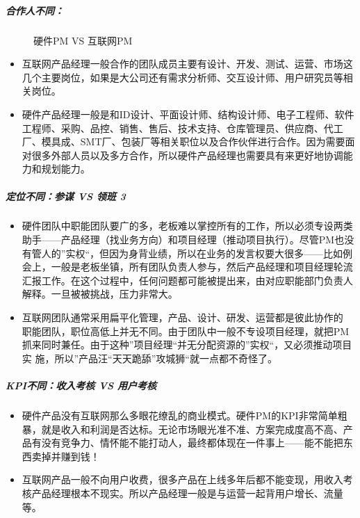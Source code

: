 \documentclass[letterpaper,11pt,english]{sphinxmanual}
\begin{document}
\subparagraph{合作人不同：}
\label{\detokenize{chapter_project/AI_hardware:id4}}
\begin{figure}[H]
\centering
\capstart

\noindent{}
\caption{硬件PM VS 互联网PM}\label{\detokenize{chapter_project/AI_hardware:id33}}\end{figure}
\begin{itemize}
\item {} 
互联网产品经理一般合作的团队成员主要有设计、开发、测试、运营、市场这几个主要岗位，如果是大公司还有需求分析师、交互设计师、用户研究员等相关岗位。

\item {} 
硬件产品经理一般是和ID设计、平面设计师、结构设计师、电子工程师、软件工程师、采购、品控、销售、售后、技术支持、仓库管理员、供应商、代工厂、模具成、SMT厂、包装厂等相关职位以及合作伙伴进行合作。因为需要面对很多外部人员以及多方合作，所以硬件产品经理也需要具有来更好地协调能力和规划能力。

\end{itemize}


\subparagraph{定位不同：参谋 VS 领班 3\sphinxfootnotemark[715]}
\label{\detokenize{chapter_project/AI_hardware:vs-3}}%
\begin{footnotetext}[715]\sphinxAtStartFootnote
{}
%
\end{footnotetext}\ignorespaces \begin{itemize}
\item {} 
硬件团队中职能团队要广的多，老板难以掌控所有的工作，所以必须专设两类助手——产品经理（找业务方向）和项目经理（推动项目执行）。尽管PM也没有管人的”实权“，但因为身背业绩，所以在业务的发言权要大很多——比如例会上，一般是老板坐镇，所有团队负责人参与，然后产品经理和项目经理轮流汇报工作。在这个过程中，任何问题都可能被提出来，由对应职能部门负责人解释。一旦被被挑战，压力非常大。

\item {} 
互联网团队通常采用扁平化管理，产品、设计、研发、运营都是彼此协作的
职能团队，职位高低上并无不同。由于团队中一般不专设项目经理，就把PM抓来同时兼任。由于这种”项目经理“并无分配资源的”实权“，又必须推动项目实
施，所以”产品汪“天天跪舔”攻城狮“就一点都不奇怪了。

\end{itemize}


\subparagraph{KPI不同：收入考核 VS 用户考核}
\label{\detokenize{chapter_project/AI_hardware:kpi-vs}}\begin{itemize}
\item {} 
硬件产品没有互联网那么多眼花缭乱的商业模式。硬件PM的KPI非常简单粗暴，就是收入和利润是否达标。无论市场眼光准不准、方案完成度高不高、产品有没有竞争力、情怀能不能打动人，最终都体现在一件事上——能不能把东西卖掉并赚到钱！

\item {} 
互联网产品一般不向用户收费，很多产品在上线多年后都不能变现，用收入考核产品经理根本不现实。所以产品经理一般是与运营一起背用户增长、流量等。

\end{itemize}
\end{document}
